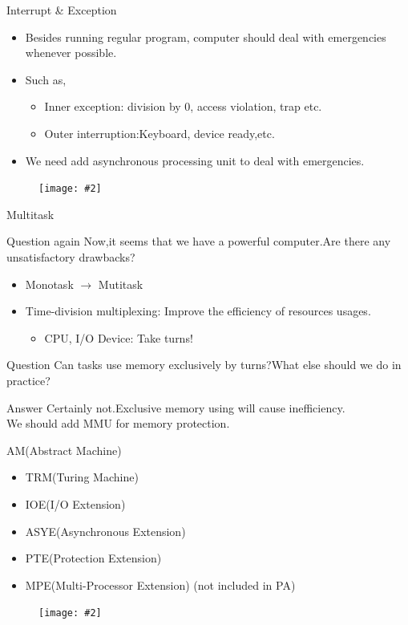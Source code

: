 \documentclass{beamer}
\newcommand{\fignocaption}[2]{
	\begin{figure}[htp]
		\centering
		\texttt{[image: \#2]}
	\end{figure}
}
\begin{document}
\begin{frame}{Interrupt \& Exception}
	\begin{itemize}
		\item Besides running regular program, computer should deal with emergencies whenever possible.
		\item Such as,
		\begin{itemize}
			\item Inner exception: division by 0, access violation, trap etc.
			\item Outer interruption:Keyboard, device ready,etc.
		\end{itemize}
		\item	\alert{We need add asynchronous processing unit to deal with emergencies.}
	\end{itemize}
	\fignocaption{scale=0.4}{interrupt.png}
\end{frame}

\begin{frame}{Multitask}
\begin{block}{Question again}
	Now,it seems that we have a powerful computer.Are there any unsatisfactory drawbacks?
\end{block}
\pause
\begin{itemize}
	\item Monotask $\longrightarrow$ Mutitask
	\item \alert{Time-division multiplexing}: Improve the efficiency of resources usages.
	\begin{itemize}
		\item CPU, I/O Device: Take turns!
	\end{itemize}
\end{itemize}
\begin{block}{Question}
	Can tasks use memory exclusively by turns?What else should we do in practice?
\end{block}
\pause
\begin{alertblock}{Answer}
	Certainly not.Exclusive memory using will cause inefficiency.\\
\alert{We should add MMU for memory protection}.
\end{alertblock}

\end{frame}

\begin{frame}{AM(Abstract Machine)}
\begin{itemize}
	\item TRM(Turing Machine)
	\item IOE(I/O Extension)
	\item ASYE(Asynchronous Extension)
	\item PTE(Protection Extension)
	\item MPE(Multi-Processor Extension) (not included in PA)
\end{itemize}
\fignocaption{scale=0.4}{am.png}
\end{frame}
\end{document}
